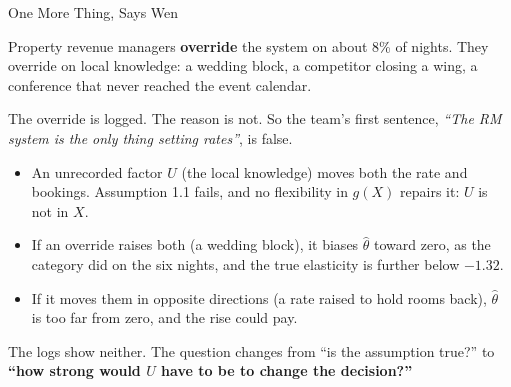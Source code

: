 \documentclass[aspectratio=169, 11pt, handout]{beamer}
\begin{document}
\begin{frame}{One More Thing, Says Wen}

Property revenue managers \textbf{override} the system on about 8\% of nights. They override on local knowledge: a wedding block, a competitor closing a wing, a conference that never reached the event calendar.

The override is logged. \textcolor{warnred}{The reason is not.} So the team's first sentence, \emph{``The RM system is the only thing setting rates''}, is \textcolor{warnred}{false}.

\medskip

\begin{itemize}
  \item An unrecorded factor $U$ (the local knowledge) moves both the rate and bookings. Assumption 1.1 fails, and no flexibility in $g(X)$ repairs it: $U$ is not in $X$.
  \item If an override raises both (a wedding block), it biases $\hat\theta$ toward zero, as the category did on the six nights, and the true elasticity is further below $-1.32$.
  \item If it moves them in opposite directions (a rate raised to hold rooms back), $\hat\theta$ is too far from zero, and the rise could pay.
\end{itemize}

\medskip

The logs show neither. The question changes from ``is the assumption true?'' to \textbf{``how strong would $U$ have to be to change the decision?''}
\end{frame}
\end{document}
